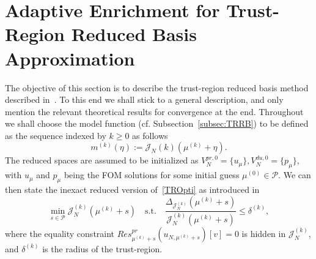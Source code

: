\section{Adaptive Enrichment for Trust-Region Reduced Basis Approximation}\label{sec:AdapTRRBAlg}

The objective of this section is to describe the trust-region reduced basis method described in~\cite[Section 4]{Keil2021}.
To this end we shall stick to a general description, and only mention the relevant theoretical results for convergence at the end.
Throughout we shall choose the model function (cf. Subsection~\ref{subsec:TRRB}) to be defined as the sequence indexed by $k \geq 0$ as follows
\begin{equation*}\label{TRModelFunc}
    m^{(k)}(\eta) := \mathcal{J}_N{(k)}(\mu^{(k)} + \eta).
\end{equation*}
The reduced spaces are assumed to be initialized as $V_N^{pr, 0} = \{ u_\mu \}, V_N^{du, 0} = \{ p_\mu \}$, with $u_\mu$ and $p_\mu$ being the FOM solutions for some initial guess $\mu^{(0)} \in \mathcal{P}$.
We can then state the inexact reduced version of~\eqref{TROpti} as introduced in~\cite[Equation 51]{Qian2017}
\begin{equation}\label{TRInexactOpti}
    \min\limits_{s \in \mathcal{P}} \mathcal{J}_N^{(k)}(\mu^{(k)} + s) \quad \text{s.t.} \quad \frac{\Delta_{\mathcal{J}_N^{(k)}}(\mu^{(k)} + s)}{\mathcal{J}_N^{(k)}(\mu^{(k)} + s)} \leq \delta^{(k)},
\end{equation}
where the equality constraint $Res_{\mu^{(k)} + s}^{pr} (u_{N, \mu^{(k)} + s})[v] = 0$ is hidden in $\mathcal{J}_N^{(k)}$, and $\delta^{(k)}$ is the radius of the trust-region.


